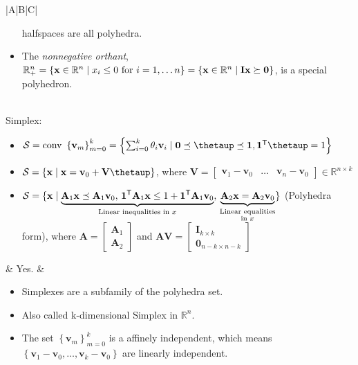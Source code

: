 \documentclass{article}
\newcommand{\trans}{\mathsf{T}}
\begin{document}
\begin{table}[ht!]
\begin{tabularx}{\textwidth}{|A|B|C|}
\begin{itemize}[leftmargin=*]
    halfspaces are all polyhedra.
    \item The \emph{nonnegative orthant}, \(\mathbb{R}_{+}^{n} = \left\{ \mathbf{x} \in \mathbb{R}^n \mid x_i \leq 0 \textnormal{ for } i=1,\dots n \right\} = \left\{ \mathbf{x} \in \mathbb{R}^n \mid \mathbf{Ix}  \succeq \mathbf{0}\right\}\), is a special polyhedron.
\end{itemize}\\
\hline
Simplex:
\begin{itemize}[leftmargin=*]
    \item \(\mathcal{S} = \textnormal{conv }\left\{ \mathbf{v}_m \right\}_{m=0}^{k} = \left\{ \sum_{i=0}^{k} \theta_i \mathbf{v}_i \mid \mathbf{0} \preceq \boldsymbol{\thetaup} \preceq \mathbf{1}, \mathbf{1}^\trans \boldsymbol{\thetaup} = 1 \right\}\)
    \item \(\mathcal{S} = \left\{ \mathbf{x} \mid \mathbf{x} = \mathbf{v}_0 + \mathbf{V} \boldsymbol{\thetaup} \right\}\), where \(\mathbf{V} = \begin{bmatrix}
        \mathbf{v}_1 - \mathbf{v}_0 & \dots & \mathbf{v}_n - \mathbf{v}_0
    \end{bmatrix} \in \mathbb{R}^{n \times k}\)
    \item \(\mathcal{S} = \{ \mathbf{x} \mid \underbrace{\mathbf{A}_1 \mathbf{x} \preceq \mathbf{A}_1 \mathbf{v}_0, \, \mathbf{1}^\trans \mathbf{A}_1 \mathbf{x} \leq 1 + \mathbf{1}^\trans\mathbf{A}_1 \mathbf{v}_0}_{\textnormal{Linear inequalities in } x}, \, \underbrace{\mathbf{A}_2 \mathbf{x} = \mathbf{A}_2 \mathbf{v}_0}_{\substack{\text{\textnormal{Linear equalities}} \\\textnormal{in } x}} \}\) (Polyhedra form), where \(\mathbf{A} = \begin{bmatrix}
        \mathbf{A}_1 \\ \mathbf{A}_2
    \end{bmatrix}\) and \(\mathbf{AV} = \begin{bmatrix}
        \mathbf{I}_{k\times k}\\
        \mathbf{0}_{n-k \times n-k}
    \end{bmatrix}\)
\end{itemize} & Yes. & \vspace{-3.5ex}
\begin{itemize}[leftmargin=*]
    \item Simplexes are a subfamily of the polyhedra set.
    \item Also called k-dimensional Simplex in \(\mathbb{R}^{n}\).
    \item The set \(\left\{ \mathbf{v}_m \right\}_{m=0}^{k}\) is a affinely independent, which means \(\left\{ \mathbf{v}_1-\mathbf{v}_0, \dots, \mathbf{v}_k-\mathbf{v}_0 \right\}\) are linearly independent.

\end{itemize}
\end{tabularx}
\end{table}
\end{document}
